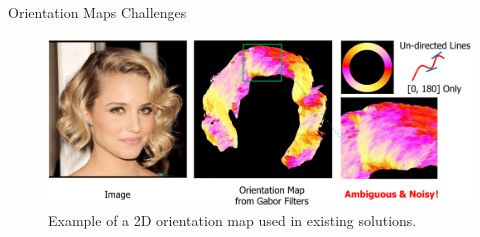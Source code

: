 \begin{frame}{Orientation Maps Challenges}
    \begin{figure}
        \centering
        \includegraphics[width=0.9\linewidth]{assets/figures/motivations/orientation-map.png}
        \caption{Example of a 2D orientation map used in existing solutions.}
        \label{fig:motivation-orientation-map}
    \end{figure}
\end{frame}
